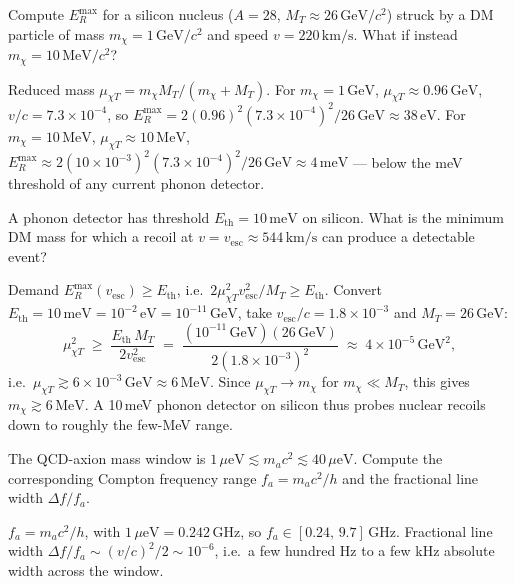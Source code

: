 \begin{exercise}
Compute $E_R^\text{max}$ for a silicon nucleus ($A=28$,
$M_T\approx 26\,\text{GeV}/c^2$) struck by a DM particle of mass
$m_\chi=1\,\text{GeV}/c^2$ and speed $v=220\,\text{km}/\text{s}$.
What if instead $m_\chi=10\,\text{MeV}/c^2$?
\begin{solution}
Reduced mass $\mu_{\chi T}=m_\chi M_T/(m_\chi+M_T)$.
For $m_\chi=1\,\text{GeV}$, $\mu_{\chi T}\approx 0.96\,\text{GeV}$,
$v/c=7.3\times 10^{-4}$, so
$E_R^\text{max}=2(0.96)^2(7.3\times 10^{-4})^2/26\,\text{GeV}\approx 38\,\text{eV}$.
For $m_\chi=10\,\text{MeV}$, $\mu_{\chi T}\approx 10\,\text{MeV}$,
$E_R^\text{max}\approx 2(10\times 10^{-3})^2(7.3\times 10^{-4})^2/26\,\text{GeV}
\approx 4\,\text{meV}$ --- below the meV threshold of any current
phonon detector.
\end{solution}
\end{exercise}

\begin{exercise}
A phonon detector has threshold $E_\text{th}=10\,\text{meV}$ on
silicon. What is the minimum DM mass for which a recoil at
$v=v_\text{esc}\approx 544\,\text{km}/\text{s}$ can produce a
detectable event?
\begin{solution}
Demand $E_R^\text{max}(v_\text{esc})\geq E_\text{th}$, i.e.\
$2\mu_{\chi T}^2 v_\text{esc}^2/M_T\geq E_\text{th}$. Convert
$E_\text{th}=10\,\text{meV}=10^{-2}\,\text{eV}=10^{-11}\,\text{GeV}$,
take $v_\text{esc}/c=1.8\times 10^{-3}$ and $M_T=26\,\text{GeV}$:
\[
\mu_{\chi T}^2 \;\geq\; \frac{E_\text{th}\,M_T}{2 v_\text{esc}^2}
\;=\; \frac{(10^{-11}\,\text{GeV})(26\,\text{GeV})}{2(1.8\times 10^{-3})^2}
\;\approx\; 4\times 10^{-5}\,\text{GeV}^2,
\]
i.e.\ $\mu_{\chi T}\gtrsim 6\times 10^{-3}\,\text{GeV}\approx 6\,\text{MeV}$.
Since $\mu_{\chi T}\to m_\chi$ for $m_\chi\ll M_T$, this gives
$m_\chi\gtrsim 6\,\text{MeV}$. A 10\,meV phonon detector on
silicon thus probes nuclear recoils down to roughly the few-MeV
range.
\end{solution}
\end{exercise}

\begin{exercise}
The QCD-axion mass window is $1\,\mu\text{eV}\lesssim m_a c^2\lesssim
40\,\mu\text{eV}$. Compute the corresponding Compton frequency
range $f_a=m_a c^2/h$ and the fractional line width
$\Delta f/f_a$.
\begin{solution}
$f_a=m_a c^2/h$, with $1\,\mu\text{eV}=0.242\,\text{GHz}$, so
$f_a\in[0.24,\,9.7]\,\text{GHz}$. Fractional line width
$\Delta f/f_a\sim (v/c)^2/2\sim 10^{-6}$, i.e.\ a few hundred Hz to
a few kHz absolute width across the window.
\end{solution}
\end{exercise}


